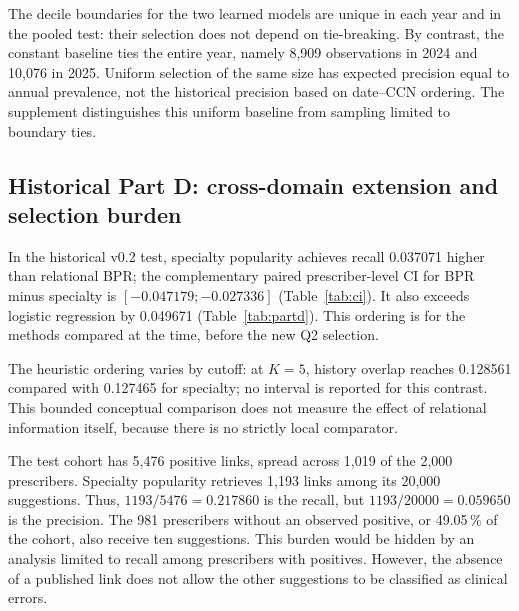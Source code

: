 The decile boundaries for the two learned models are unique in each year and in the pooled test: their selection does not depend on tie-breaking. By contrast, the constant baseline ties the entire year, namely 8,909 observations in 2024 and 10,076 in 2025. Uniform selection of the same size has expected precision equal to annual prevalence, not the historical precision based on date--CCN ordering. The supplement distinguishes this uniform baseline from sampling limited to boundary ties.

\subsection{Historical Part D: cross-domain extension and selection burden}

\begin{table}[!htbp]
\centering\small
\caption{Part D, 2024 test, exact generic identity. Recalls are at $K=10$. Recall and MRR cover the 1,019 prescribers with positives; P@10 uses the 2,000 eligible prescribers. BPR macro/MRR is taken to six decimals from the report. Sources: summary and compact run\cite{hgbresults,hgbpartd}.}
\label{tab:partd}

\end{table}

In the historical v0.2 test, specialty popularity achieves recall 0.037071 higher than relational BPR; the complementary paired prescriber-level CI for BPR minus specialty is $[-0.047179;-0.027336]$ (Table~\ref{tab:ci}). It also exceeds logistic regression by 0.049671 (Table~\ref{tab:partd}). This ordering is for the methods compared at the time, before the new Q2 selection.

The heuristic ordering varies by cutoff: at $K=5$, history overlap reaches 0.128561 compared with 0.127465 for specialty; no interval is reported for this contrast. This bounded conceptual comparison does not measure the effect of relational information itself, because there is no strictly local comparator.

The test cohort has 5,476 positive links, spread across 1,019 of the 2,000 prescribers. Specialty popularity retrieves 1,193 links among its 20,000 suggestions. Thus, $1193/5476=0.217860$ is the recall, but $1193/20000=0.059650$ is the precision. The 981 prescribers without an observed positive, or 49.05\,\% of the cohort, also receive ten suggestions\cite{hgbpartd}. This burden would be hidden by an analysis limited to recall among prescribers with positives. However, the absence of a published link does not allow the other suggestions to be classified as clinical errors.



